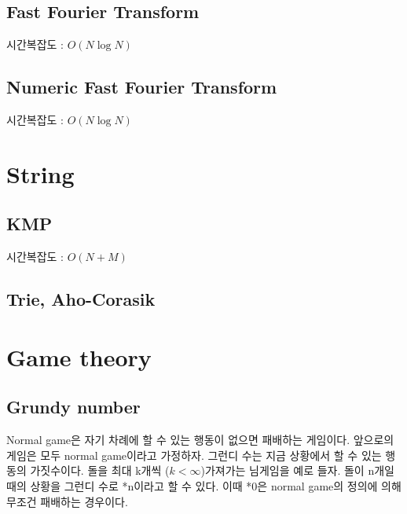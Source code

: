 \documentclass[10pt,landscape,a4paper,twocolumn]{article}
\begin{document}
\subsection{Fast Fourier Transform}
시간복잡도 : $O(N\log{N})$


\subsection{Numeric Fast Fourier Transform}
시간복잡도 : $O(N\log{N})$




\section{String}
\subsection{KMP}
시간복잡도 : $O(N+M)$


\subsection{Trie, Aho-Corasik}



\section{Game theory}
\subsection{Grundy number}
Normal game은 자기 차례에 할 수 있는 행동이 없으면 패배하는 게임이다.
앞으로의 게임은 모두 normal game이라고 가정하자.
그런디 수는 지금 상황에서 할 수 있는 행동의 가짓수이다.
돌을 최대 k개씩 ($k<\infty$)가져가는 님게임을 예로 들자.
돌이 n개일 때의 상황을 그런디 수로 *n이라고 할 수 있다.
이때 *0은 normal game의 정의에 의해 무조건 패배하는 경우이다.
\end{document}
